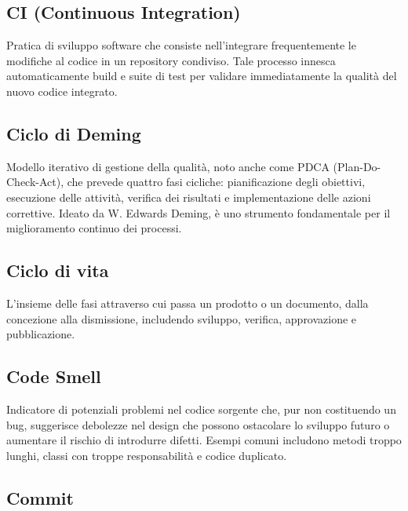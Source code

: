 \documentclass[a4paper, 11pt, oneside]{scrartcl} %
\begin{document}
\subsection*{CI (Continuous Integration)}
Pratica di sviluppo software che consiste nell'integrare frequentemente le modifiche al codice in un repository condiviso. Tale processo innesca automaticamente build e suite di test per validare immediatamente la qualità del nuovo codice integrato.
\vspace{0.5cm}

\subsection*{Ciclo di Deming}
Modello iterativo di gestione della qualità, noto anche come PDCA (Plan-Do-Check-Act), che prevede quattro fasi cicliche: pianificazione degli obiettivi, esecuzione delle attività, verifica dei risultati e implementazione delle azioni correttive. Ideato da W. Edwards Deming, è uno strumento fondamentale per il miglioramento continuo dei processi.
\vspace{0.5cm}

\subsection*{Ciclo di vita}


L'insieme delle fasi attraverso cui passa un prodotto o un documento, dalla concezione alla dismissione, includendo sviluppo, verifica, approvazione e pubblicazione.

\vspace{0.5cm}

\subsection*{Code Smell}
Indicatore di potenziali problemi nel codice sorgente che, pur non costituendo un bug, suggerisce debolezze nel design che possono ostacolare lo sviluppo futuro o aumentare il rischio di introdurre difetti. Esempi comuni includono metodi troppo lunghi, classi con troppe responsabilità e codice duplicato.
\vspace{0.5cm}

\subsection*{Commit}
\end{document}
